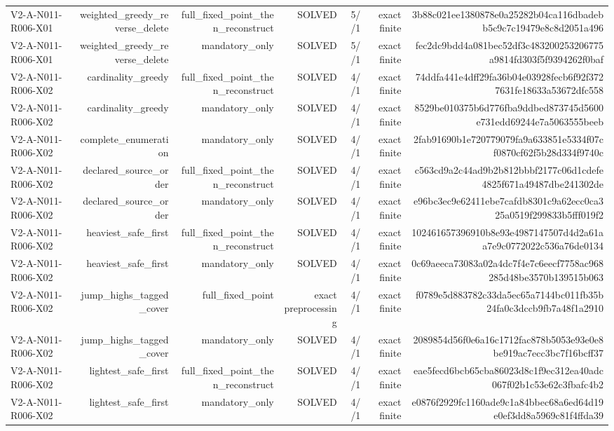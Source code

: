 {\begin{longtable}{lrrrrrr}
V2-A-N011-R006-X01 & weighted\_greedy\_reverse\_delete & full\_fixed\_point\_then\_reconstruct & SOLVED & 5//1 & exact finite & 3b88c021ee1380878e0a25282b04ca116dbadebb5c9c7c19479e8c8d2051a496 \\
V2-A-N011-R006-X01 & weighted\_greedy\_reverse\_delete & mandatory\_only & SOLVED & 5//1 & exact finite & fec2dc9bdd4a081bec52df3c483200253206775a9814fd303f5f9394262f0baf \\
V2-A-N011-R006-X02 & cardinality\_greedy & full\_fixed\_point\_then\_reconstruct & SOLVED & 4//1 & exact finite & 74ddfa441e4dff29fa36b04e03928fecb6f92f3727631fe18633a53672dfc558 \\
V2-A-N011-R006-X02 & cardinality\_greedy & mandatory\_only & SOLVED & 4//1 & exact finite & 8529be010375b6d776fba9ddbed873745d5600e731edd69244e7a5063555beeb \\
V2-A-N011-R006-X02 & complete\_enumeration & mandatory\_only & SOLVED & 4//1 & exact finite & 2fab91690b1e720779079fa9a633851e5334f07cf0870cf62f5b28d334f9740c \\
V2-A-N011-R006-X02 & declared\_source\_order & full\_fixed\_point\_then\_reconstruct & SOLVED & 4//1 & exact finite & c563cd9a2c44ad9b2b812bbbf2177c06d1cdefe4825f671a49487dbe241302de \\
V2-A-N011-R006-X02 & declared\_source\_order & mandatory\_only & SOLVED & 4//1 & exact finite & e96bc3ec9e62411ebe7cafdb8301c9a62ecc0ca325a0519f299833b5fff019f2 \\
V2-A-N011-R006-X02 & heaviest\_safe\_first & full\_fixed\_point\_then\_reconstruct & SOLVED & 4//1 & exact finite & 102461657396910b8e93e4987147507d4d2a61aa7e9c0772022c536a76de0134 \\
V2-A-N011-R006-X02 & heaviest\_safe\_first & mandatory\_only & SOLVED & 4//1 & exact finite & 0c69aeeca73083a02a4dc7f4e7c6eecf7758ac968285d48be3570b139515b063 \\
V2-A-N011-R006-X02 & jump\_highs\_tagged\_cover & full\_fixed\_point & exact preprocessing & 4//1 & exact finite & f0789e5d883782c33da5ec65a7144bc011fb35b24fa0c3dccb9fb7a48f1a2910 \\
V2-A-N011-R006-X02 & jump\_highs\_tagged\_cover & mandatory\_only & SOLVED & 4//1 & exact finite & 2089854d56f0e6a16c1712fac878b5053e93e0e8be919ac7ecc3bc7f16bcff37 \\
V2-A-N011-R006-X02 & lightest\_safe\_first & full\_fixed\_point\_then\_reconstruct & SOLVED & 4//1 & exact finite & eae5fecd6bcb65cba86023d8c1f9ec312ea40adc067f02b1c53e62c3fbafc4b2 \\
V2-A-N011-R006-X02 & lightest\_safe\_first & mandatory\_only & SOLVED & 4//1 & exact finite & e0876f2929fc1160ade9c1a84bbec68a6ed64d19e0ef3dd8a5969c81f4ffda39 \\

\end{longtable}}
